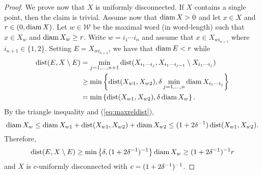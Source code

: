 \documentclass{amsart}
\DeclareMathOperator{\dist}{dist}
\begin{document}
\begin{proof}
We prove now that $X$ is uniformly disconnected. If $X$ contains a single point, then the claim is trivial. Assume now that $\operatorname{diam}{X}>0$ and let $x \in X$ and $r \in (0,\operatorname{diam}{X})$. Let $w \in \mathcal{W}$ be the maximal word (in word-length) such that $x\in X_w$ and $\operatorname{diam}{X_w}\geq r$.
Write $w=i_1\cdots i_n$ and assume that $x\in X_{wi_{n+1}}$ where $i_{n+1}\in\{1,2\}$. Setting $E = X_{wi_{n+1}}$, we have that $\operatorname{diam}{E} < r$ while
\begin{align*} 
\dist(E,X \setminus E) &= \min_{j=1,\dots,n+1} \dist(X_{i_1\cdots i_j}, X_{i_1\cdots i_{j-1}} \setminus X_{i_1\cdots i_j})\\
&\geq \min\left\{ \dist(X_{w1},X_{w2}), \d\min_{j=1,\dots,n} \diam{X_{i_1\cdots i_j}}\right\}\\
&= \min\left\{ \dist(X_{w1},X_{w2}), \d\diam{X_{w}}\right\}.
\end{align*}
By the triangle inequality and (\ref{eq:maxreldist}),
\[ \diam{X_w} \leq \diam{X_{w1}} + \dist(X_{w1},X_{w2}) + \diam{X_{w2}} \leq (1+2\d^{-1})\dist(X_{w1},X_{w2}).\]
Therefore,
\[ \dist(E,X\setminus E) \geq \min\left\{\d,(1+2\d^{-1})^{-1}\right\}\diam{X_w} \geq (1+2\d^{-1})^{-1}r\]
and $X$ is $c$-uniformly disconnected with $c=(1+2\delta^{-1})^{-1}$.
\end{proof}

\begin{comment}

\begin{remark}
Lemma \ref{lem:UDreldist} fails if ``max'' is replaced by ``min'' in (\ref{eq:maxreldist}).  Indeed, set 
\[ X = [-1,0]\cup\{1/n : n\in\N\}\]
and define a collection $\{X_w : w\in\mathcal{W}\}$ by the rules:
\begin{enumerate}
\item $X_{\varepsilon} = X$;
\item if we have defined $X_w$ for some $w\in\{1,2\}^*$ and if $w$ does not contain the digit ``1'', then $X_{w1}=\{\frac{1}{|w|+1}\}$ and $X_{w2}=X_w\setminus X_{w1}$; 
\item if we have defined $X_w$ for some $w\in\{1,2\}^*$ and if $w$ contains the digit ``1'', then $X_{w1}=X_w$ and $w2\not\in\mathcal{W}$.
\end{enumerate}
It is easy to see that $\{X_w : w\in\mathcal{W}\}$ satisfies (i)--(iv) of Lemma \ref{lem:UDreldist} except that (\ref{eq:maxreldist}) holds with ``min''. However, $X$ is not uniformly disconnected.
\end{remark}

\end{comment}
\end{document}
